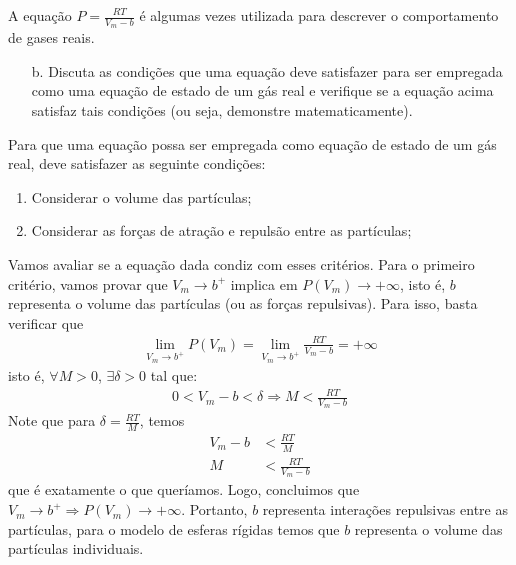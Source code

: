 \begin{xcs}
    A equação \( P = \frac{RT}{V_m - b} \) é algumas vezes utilizada para
    descrever o comportamento de gases reais. 
    \begin{enumerate}[label=\alph*.]
        \item[b.] Discuta as condições que uma equação deve satisfazer para ser
            empregada como uma equação de estado de um gás real e verifique se a
            equação acima satisfaz tais condições (ou seja, demonstre
            matematicamente). 
    \end{enumerate}
\end{xcs}
\begin{rsl}
    Para que uma equação possa ser empregada como equação de estado de um gás real,
    deve satisfazer as seguinte condições:
    \begin{enumerate}
        \item Considerar o volume das partículas;
        \item Considerar as forças de atração e repulsão entre as partículas;
    \end{enumerate}
    Vamos avaliar se a equação dada condiz com esses critérios. Para o primeiro
    critério, vamos
    provar que \( V_m \to b^+ \) implica em \( P(V_m) \to +\infty \), isto é, \(
    b\) representa o volume das partículas (ou as forças repulsivas).
    Para isso, basta verificar que 
    \begin{align*}
        \lim_{V_m \to b^+} P(V_m) = \lim_{V_m \to b^+} \frac{RT}{V_m-b} = +\infty
    \end{align*}
    isto é, \( \forall M > 0 \), \( \exists \delta > 0 \) tal que:
    \begin{align*}
        0 < V_m - b < \delta \Rightarrow M < \frac{RT}{V_m-b}
    \end{align*}
    Note que para \( \delta = \frac{RT}{M} \), temos
    \begin{align*}
        V_m - b &< \frac{RT}{M}\\
        M &< \frac{RT}{V_m - b} 
    \end{align*}
    que é exatamente o que queríamos. Logo, concluimos que \( V_m \to b^+
    \Rightarrow P(V_m) \to +\infty \). Portanto, \( b \) representa interações
    repulsivas entre as partículas, para o modelo de esferas rígidas temos que
    \( b \) representa o volume das partículas individuais.


\end{rsl}
